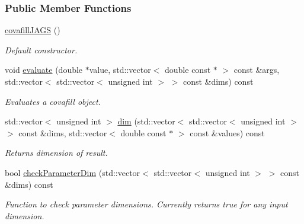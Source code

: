 \subsubsection*{Public Member Functions}
\begin{DoxyCompactItemize}
\item 
\hypertarget{classjags_1_1covafillJAGS_1_1covafillJAGS_aaff4734c50b3acdb85a7db82aef92cb7}{}\hyperlink{classjags_1_1covafillJAGS_1_1covafillJAGS_aaff4734c50b3acdb85a7db82aef92cb7}{covafill\+J\+A\+G\+S} ()\label{classjags_1_1covafillJAGS_1_1covafillJAGS_aaff4734c50b3acdb85a7db82aef92cb7}

\begin{DoxyCompactList}\small\item\em Default constructor. \end{DoxyCompactList}\item 
\hypertarget{classjags_1_1covafillJAGS_1_1covafillJAGS_adf1dc88d47a4bb95fe3ff5f0f340bb9c}{}void \hyperlink{classjags_1_1covafillJAGS_1_1covafillJAGS_adf1dc88d47a4bb95fe3ff5f0f340bb9c}{evaluate} (double $\ast$value, std\+::vector$<$ double const $\ast$ $>$ const \&args, std\+::vector$<$ std\+::vector$<$ unsigned int $>$ $>$ const \&dims) const \label{classjags_1_1covafillJAGS_1_1covafillJAGS_adf1dc88d47a4bb95fe3ff5f0f340bb9c}

\begin{DoxyCompactList}\small\item\em Evaluates a covafill object. \end{DoxyCompactList}\item 
\hypertarget{classjags_1_1covafillJAGS_1_1covafillJAGS_aaaa1d047cb8bba343c665bd48b4b8b2b}{}std\+::vector$<$ unsigned int $>$ \hyperlink{classjags_1_1covafillJAGS_1_1covafillJAGS_aaaa1d047cb8bba343c665bd48b4b8b2b}{dim} (std\+::vector$<$ std\+::vector$<$ unsigned int $>$ $>$ const \&dims, std\+::vector$<$ double const $\ast$ $>$ const \&values) const \label{classjags_1_1covafillJAGS_1_1covafillJAGS_aaaa1d047cb8bba343c665bd48b4b8b2b}

\begin{DoxyCompactList}\small\item\em Returns dimension of result. \end{DoxyCompactList}\item 
\hypertarget{classjags_1_1covafillJAGS_1_1covafillJAGS_a76aaca437c8bd6cbd0f315ab00f03ac8}{}bool \hyperlink{classjags_1_1covafillJAGS_1_1covafillJAGS_a76aaca437c8bd6cbd0f315ab00f03ac8}{check\+Parameter\+Dim} (std\+::vector$<$ std\+::vector$<$ unsigned int $>$ $>$ const \&dims) const \label{classjags_1_1covafillJAGS_1_1covafillJAGS_a76aaca437c8bd6cbd0f315ab00f03ac8}

\begin{DoxyCompactList}\small\item\em Function to check parameter dimensions. Currently returns true for any input dimension. \end{DoxyCompactList}\end{DoxyCompactItemize}


